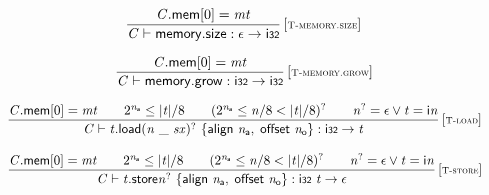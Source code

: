 \vspace{1ex}

$$
\begin{array}{@{}c@{}}\displaystyle
\frac{
{\mathit{C}}.\mathsf{mem}{}[0] = {\mathit{mt}}
}{
{\mathit{C}} \vdash \mathsf{memory.size} : \epsilon \rightarrow \mathsf{i{\scriptstyle32}}
} \, {[\textsc{\scriptsize T{-}memory.size}]}
\qquad
\end{array}
$$

$$
\begin{array}{@{}c@{}}\displaystyle
\frac{
{\mathit{C}}.\mathsf{mem}{}[0] = {\mathit{mt}}
}{
{\mathit{C}} \vdash \mathsf{memory.grow} : \mathsf{i{\scriptstyle32}} \rightarrow \mathsf{i{\scriptstyle32}}
} \, {[\textsc{\scriptsize T{-}memory.grow}]}
\qquad
\end{array}
$$

$$
\begin{array}{@{}c@{}}\displaystyle
\frac{
{\mathit{C}}.\mathsf{mem}{}[0] = {\mathit{mt}}
 \qquad
{2^{{\mathit{n}}_{{\mathsf{a}}}}} \leq {|{\mathit{t}}|} / 8
 \qquad
({2^{{\mathit{n}}_{{\mathsf{a}}}}} \leq {\mathit{n}} / 8 < {|{\mathit{t}}|} / 8)^?
 \qquad
{{\mathit{n}}^?} = \epsilon \lor {\mathit{t}} = {\mathsf{i}}{{\mathit{n}}}
}{
{\mathit{C}} \vdash {{\mathit{t}}.\mathsf{load}}{{({\mathit{n}}~\mathsf{\_}~{\mathit{sx}})^?}}~\{ \begin{array}[t]{@{}l@{}}
\mathsf{align}~{\mathit{n}}_{{\mathsf{a}}},\; \mathsf{offset}~{\mathit{n}}_{{\mathsf{o}}} \}\end{array} : \mathsf{i{\scriptstyle32}} \rightarrow {\mathit{t}}
} \, {[\textsc{\scriptsize T{-}load}]}
\qquad
\end{array}
$$

$$
\begin{array}{@{}c@{}}\displaystyle
\frac{
{\mathit{C}}.\mathsf{mem}{}[0] = {\mathit{mt}}
 \qquad
{2^{{\mathit{n}}_{{\mathsf{a}}}}} \leq {|{\mathit{t}}|} / 8
 \qquad
({2^{{\mathit{n}}_{{\mathsf{a}}}}} \leq {\mathit{n}} / 8 < {|{\mathit{t}}|} / 8)^?
 \qquad
{{\mathit{n}}^?} = \epsilon \lor {\mathit{t}} = {\mathsf{i}}{{\mathit{n}}}
}{
{\mathit{C}} \vdash {{\mathit{t}}.\mathsf{store}}{{{\mathit{n}}^?}}~\{ \begin{array}[t]{@{}l@{}}
\mathsf{align}~{\mathit{n}}_{{\mathsf{a}}},\; \mathsf{offset}~{\mathit{n}}_{{\mathsf{o}}} \}\end{array} : \mathsf{i{\scriptstyle32}}~{\mathit{t}} \rightarrow \epsilon
} \, {[\textsc{\scriptsize T{-}store}]}
\qquad
\end{array}
$$

